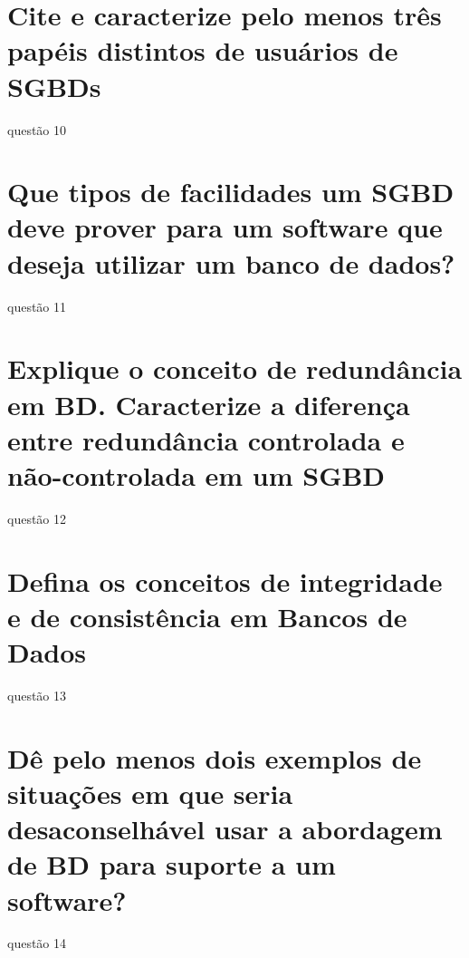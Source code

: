 \documentclass[12pt]{article}
\begin{document}
\section{Cite e caracterize pelo menos três papéis distintos de usuários de SGBDs}
questão 10

\section{Que tipos de facilidades um SGBD deve prover para um software que deseja utilizar um banco de dados?}
questão 11

\section{Explique o conceito de redundância em BD. Caracterize a diferença entre redundância controlada e não-controlada em um SGBD}
questão 12

\section{Defina os conceitos de integridade e de consistência em Bancos de Dados}
questão 13

\section{Dê pelo menos dois exemplos de situações em que seria desaconselhável usar a abordagem de BD para suporte a um software?}
questão 14
\end{document}
